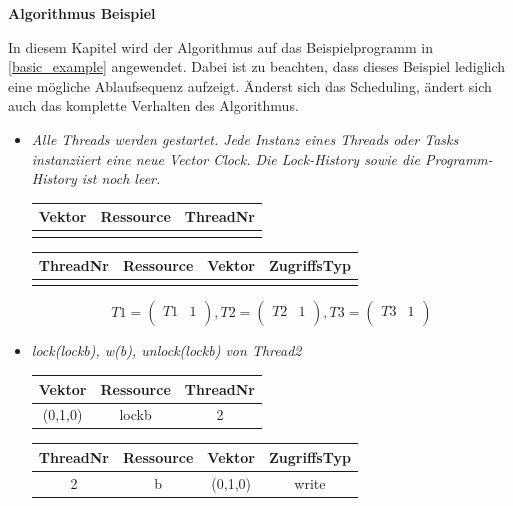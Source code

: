\documentclass[10pt,a4paper]{article}
\begin{document}
\textbf{Algorithmus Beispiel}
\begin{flushleft}
In diesem Kapitel wird der Algorithmus auf das Beispielprogramm  in \autoref{basic_example} angewendet. Dabei ist zu beachten, dass dieses Beispiel lediglich eine mögliche Ablaufsequenz aufzeigt. Änderst sich das Scheduling, ändert sich auch das komplette Verhalten des Algorithmus.\\
\begin{itemize}
\item \textit{Alle Threads werden gestartet. Jede Instanz eines Threads oder Tasks instanziiert eine neue Vector Clock. Die Lock-History sowie die Programm-History ist noch leer.}\\[0.3cm]
\begin{tabular}{ c c c }
  	Vektor & Ressource & ThreadNr \\\hline
  	  &   &   \\\hline
\end{tabular}\hspace*{0.5cm}
\begin{tabular}{ c c c c }
  	ThreadNr & Ressource & Vektor & ZugriffsTyp \\\hline
  	  &   &   &   \\\hline
\end{tabular}
\[
	T1 = \begin{pmatrix}
		T1 & 1\\
	\end{pmatrix}
	, T2 = \begin{pmatrix}
		T2 & 1\\
	\end{pmatrix}
	, T3 = \begin{pmatrix}
		T3 & 1\\
	\end{pmatrix}
\]
\item \textit{lock(lockb), w(b), unlock(lockb) von Thread2}\\[0.3cm]
\begin{tabular}{ c c c }
  	Vektor & Ressource & ThreadNr \\\hline
  	(0,1,0) & lockb & 2 \\\hline
\end{tabular}\hspace*{0.5cm}
\begin{tabular}{ c c c c }
  	ThreadNr & Ressource & Vektor & ZugriffsTyp \\\hline
  	2 & b & (0,1,0) & write \\\hline
\end{tabular}

\end{itemize}
\end{flushleft}
\end{document}
